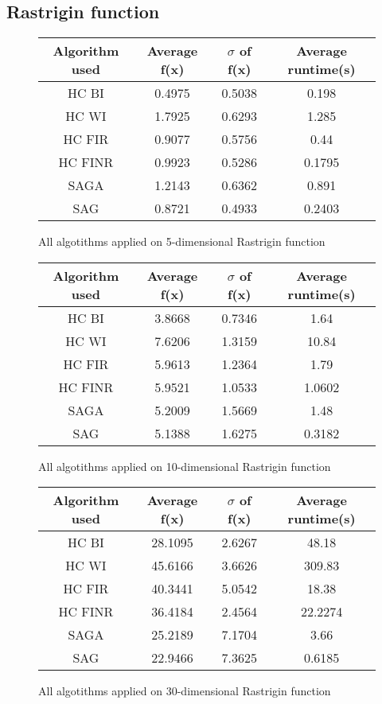 \documentclass{article}
\begin{document}
\subsection{Rastrigin function}

\begin{figure}[H]
	\begin{tabular}{|c||c|c|c|} \hline
		Algorithm used & Average f(x) & $\sigma$ of f(x) & Average runtime(s) \\ \hline \hline
		HC BI & 0.4975 & 0.5038 & 0.198 \\ \hline
		HC WI & 1.7925 & 0.6293 & 1.285 \\ \hline
		HC FIR & 0.9077 & 0.5756 & 0.44 \\ \hline
		HC FINR & 0.9923 & 0.5286 & 0.1795 \\ \hline
		SAGA & 1.2143 & 0.6362 & 0.891 \\ \hline
		SAG & 0.8721 & 0.4933 & 0.2403 \\ \hline
\end{tabular}
\caption{All algotithms applied on 5-dimensional Rastrigin function}
\end{figure}

\begin{figure}[H]
	\begin{tabular}{|c||c|c|c|} \hline
		Algorithm used & Average f(x) & $\sigma$ of f(x) & Average runtime(s) \\ \hline \hline
		HC BI & 3.8668 & 0.7346 & 1.64 \\ \hline
		HC WI & 7.6206 & 1.3159 & 10.84 \\ \hline
		HC FIR & 5.9613 & 1.2364 & 1.79 \\ \hline
		HC FINR & 5.9521 & 1.0533 & 1.0602 \\ \hline
		SAGA & 5.2009 & 1.5669 & 1.48 \\ \hline
		SAG & 5.1388 & 1.6275 & 0.3182 \\ \hline
\end{tabular}
\caption{All algotithms applied on 10-dimensional Rastrigin function}
\end{figure}

\begin{figure}[H]
	\begin{tabular}{|c||c|c|c|} \hline
		Algorithm used & Average f(x) & $\sigma$ of f(x) & Average runtime(s) \\ \hline \hline
		HC BI & 28.1095 & 2.6267 & 48.18 \\ \hline
		HC WI & 45.6166 & 3.6626 & 309.83 \\ \hline
		HC FIR & 40.3441 & 5.0542 & 18.38 \\ \hline
		HC FINR & 36.4184 & 2.4564 & 22.2274 \\ \hline
		SAGA & 25.2189 & 7.1704 & 3.66 \\ \hline
		SAG & 22.9466 & 7.3625 & 0.6185 \\ \hline
\end{tabular}
\caption{All algotithms applied on 30-dimensional Rastrigin function}
\end{figure}
\end{document}
